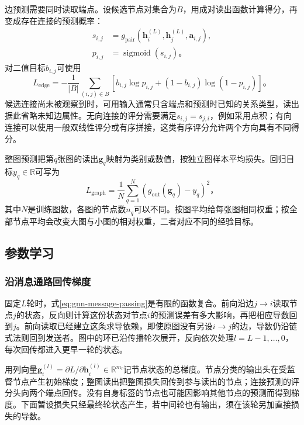 边预测需要同时读取端点。设候选节点对集合为$B$，用成对读出函数计算得分，再变成存在连接的预测概率：
\[
  \begin{aligned}
    s_{i,j}&=g_{\mathrm{pair}}(\bm{h}_i^{(L)},\bm{h}_j^{(L)},\bm{a}_{i,j}),\\
    p_{i,j}&=\operatorname{sigmoid}(s_{i,j})\text{。}
  \end{aligned}
\]
对二值目标$b_{i,j}$可使用
\begin{equation}
  L_{\mathrm{edge}}=-\frac{1}{|B|}\sum_{(i,j)\in B}
    \left[b_{i,j}\log p_{i,j}+(1-b_{i,j})\log(1-p_{i,j})\right]\text{。}
  \label{eq:gnn-edge-loss}
\end{equation}
候选连接尚未被观察到时，可用输入通常只含端点和预测时已知的关系类型，读出据此省略未知边属性。无向连接的评分需要满足$s_{i,j}=s_{j,i}$，例如采用点积；有向连接可以使用一般双线性评分或有序拼接，这类有序评分允许两个方向具有不同得分。

整图预测把第$q$张图的读出$\bm{g}_q$映射为类别或数值，按独立图样本平均损失。回归目标$y_q\in\mathbb{R}$可写为
\begin{equation}
  L_{\mathrm{graph}}=\frac{1}{N}\sum_{q=1}^{N}
    \left(g_{\mathrm{out}}(\bm{g}_q)-y_q\right)^2\text{，}
  \label{eq:gnn-graph-loss}
\end{equation}
其中$N$是训练图数，各图的节点数$n_q$可以不同。按图平均给每张图相同权重；按全部节点平均会改变大图与小图的相对权重，二者对应不同的经验目标。

\subsection{参数学习}
\label{sec:gnn-learning}

\subsubsection{沿消息通路回传梯度}
\label{sec:gnn-message-backprop}

固定$L$轮时，式\eqref{eq:gnn-message-passing}是有限的函数复合。前向沿边$j\to i$读取节点$j$的状态，反向则计算这份状态对节点$i$的预测误差有多大影响，再把相应导数回到$j$。前向读取已经建立这条求导依赖，即使原图没有另设$i\to j$的边，导数仍沿链式法则回到发送者。图中的环已沿传播轮次展开，反向依次处理$l=L-1,\ldots,0$，每次回传都进入更早一轮的状态。

用列向量$\bm{g}_i^{(l)}=\partial L/\partial\bm{h}_i^{(l)}\in\mathbb{R}^{m_l}$记节点状态的总梯度。节点分类的输出头在受监督节点产生初始梯度；整图读出把整图损失回传到参与读出的节点；连接预测的评分头向两个端点回传。没有自身标签的节点也可能因影响其他节点的预测而得到梯度。下面暂设损失只经最终轮状态产生，若中间轮也有输出，须在该轮另加直接损失的导数。

